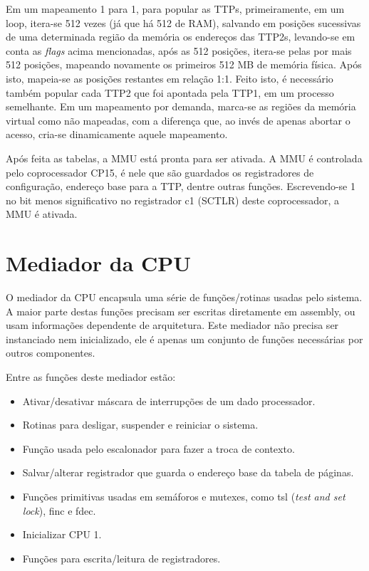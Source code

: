 
Em um mapeamento 1 para 1, para popular as TTPs, primeiramente, em um loop, itera-se 512 vezes (já que há 512 de RAM), salvando em posições sucessivas de uma determinada região da memória os endereços das TTP2s, levando-se em conta as \emph{flags} acima mencionadas, após as 512 posições, itera-se pelas por mais 512 posições, mapeando novamente os primeiros 512 MB de memória física. Após isto, mapeia-se as posições restantes em relação 1:1. Feito isto, é necessário também popular cada TTP2 que foi apontada pela TTP1, em um processo semelhante. Em um mapeamento por demanda, marca-se as regiões da memória virtual como não mapeadas, com a diferença que, ao invés de apenas abortar o acesso, cria-se dinamicamente aquele mapeamento.

Após feita as tabelas, a MMU está pronta para ser ativada. A MMU é controlada pelo coprocessador CP15, é nele que são guardados os registradores de configuração, endereço base para a TTP, dentre outras funções. Escrevendo-se 1 no bit menos significativo no registrador c1 (SCTLR) deste coprocessador, a MMU é ativada.


\section{Mediador da CPU}

O mediador da CPU encapsula uma série de funções/rotinas usadas pelo sistema. A maior parte destas funções precisam ser escritas diretamente em assembly, ou usam informações dependente de arquitetura. Este mediador não precisa ser instanciado nem inicializado, ele é apenas um conjunto de funções necessárias por outros componentes.

Entre as funções deste mediador estão:

\begin{itemize}

\item Ativar/desativar máscara de interrupções de um dado processador.
\item Rotinas para desligar, suspender e reiniciar o sistema.
\item Função usada pelo escalonador para fazer a troca de contexto.
\item Salvar/alterar registrador que guarda o endereço base da tabela de páginas.
\item Funções primitivas usadas em semáforos e mutexes, como tsl (\emph{test and set lock}), finc e fdec.
\item Inicializar CPU 1.
\item Funções para escrita/leitura de registradores.

\end{itemize}


